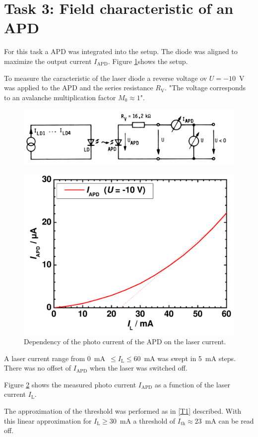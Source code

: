 \section{Task 3: Field characteristic of an APD}

For this task a APD was integrated into the setup. The diode was aligned to maximize the output current $I_{\mathrm{APD}}$.
Figure \ref{fig:T3_setup}\footnotemark[1] shows the setup.

To measure the caracteristic of the laser diode a reverse voltage ov $U = -10$~V was applied to the APD and the series resistance $R_{\mathrm{V}}$. "The voltage corresponds to an avalanche multiplication factor $M_0 \approx 1$"\footnotemark[1].

\begin{figure}%
\centering
\includegraphics[width=.85\columnwidth]{Grafiken/T3_setup.jpg}%
\caption{}%
\label{fig:T3_setup}%
\end{figure}


\begin{figure}%
\centering
\includegraphics[width=.5\columnwidth]{Grafiken/T3_laser.pdf}%
\caption{Dependency of the photo current of the APD on the laser current.}%
\label{fig:T3_laser}%
\end{figure}


A laser current range from 0~mA~$\leq I_{\mathrm{L}} \leq 60$~mA was swept in 5~mA steps. There was no offset of $I_{\mathrm{APD}}$ when the laser was switched off. 

Figure \ref{fig:T3_laser} shows the measured photo current $I_{\mathrm{APD}}$ as a function of the laser current $I_{\mathrm{L}}$. 

The approximation of the threshold was performed as in \ref{T1} described.
With this linear approximation for $I_{\mathrm{L}} \geq 30$~mA a threshold of $I_{\mathrm{th}} \approx 23$~mA can be read off.


